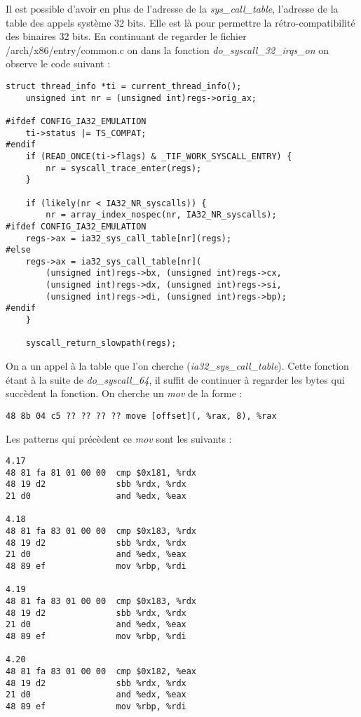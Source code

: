 \documentclass[journal, a4paper]{IEEEtran}
\begin{document}
Il est possible d'avoir en plus de l'adresse de la \textit{sys\_call\_table}, l'adresse de la table des appels système 32 bits. Elle est là pour permettre la rétro-compatibilité des binaires 32 bits. En continuant de regarder le fichier /arch/x86/entry/common.c on dans la fonction \textit{do\_syscall\_32\_irqs\_on} on observe le code suivant :
\begin{lstlisting}[style=CStyle]
struct thread_info *ti = current_thread_info();
	unsigned int nr = (unsigned int)regs->orig_ax;

#ifdef CONFIG_IA32_EMULATION
	ti->status |= TS_COMPAT;
#endif
	if (READ_ONCE(ti->flags) & _TIF_WORK_SYSCALL_ENTRY) {
		nr = syscall_trace_enter(regs);
	}

	if (likely(nr < IA32_NR_syscalls)) {
		nr = array_index_nospec(nr, IA32_NR_syscalls);
#ifdef CONFIG_IA32_EMULATION
	regs->ax = ia32_sys_call_table[nr](regs);
#else
	regs->ax = ia32_sys_call_table[nr](
		(unsigned int)regs->bx, (unsigned int)regs->cx,
		(unsigned int)regs->dx, (unsigned int)regs->si,
		(unsigned int)regs->di, (unsigned int)regs->bp);
#endif
	}

	syscall_return_slowpath(regs);
\end{lstlisting}
On a un appel à la table que l'on cherche (\textit{ia32\_sys\_call\_table}).
Cette fonction étant à la suite de \textit{do\_syscall\_64}, il suffit de continuer à regarder les bytes qui succèdent la fonction. On cherche un \textit{mov} de la forme :
\begin{lstlisting}[style=CStyle]
48 8b 04 c5 ?? ?? ?? ?? move [offset](, %rax, 8), %rax
\end{lstlisting}
Les patterns qui précèdent ce \textit{mov} sont les suivants :
\begin{lstlisting}[style=CStyle]
4.17  
48 81 fa 81 01 00 00  cmp $0x181, %rdx  
48 19 d2              sbb %rdx, %rdx  
21 d0                 and %edx, %eax  

4.18  
48 81 fa 83 01 00 00  cmp $0x183, %rdx  
48 19 d2              sbb %rdx, %rdx  
21 d0                 and %edx, %eax  
48 89 ef              mov %rbp, %rdi  

4.19  
48 81 fa 83 01 00 00  cmp $0x183, %rdx  
48 19 d2              sbb %rdx, %rdx  
21 d0                 and %edx, %eax  
48 89 ef              mov %rbp, %rdi  

4.20  
48 81 fa 83 01 00 00  cmp $0x182, %eax  
48 19 d2              sbb %rdx, %rdx  
21 d0                 and %edx, %eax  
48 89 ef              mov %rbp, %rdi  
\end{lstlisting}
\end{document}
